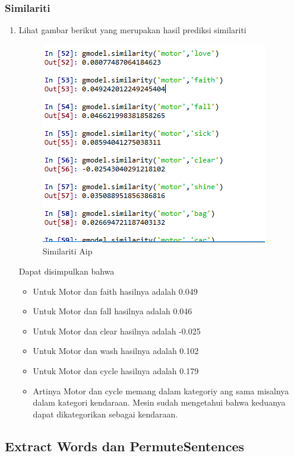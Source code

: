 \subsubsection{Similariti}
\begin{enumerate}
\item Lihat gambar berikut yang merupakan hasil prediksi similariti
\begin{figure}[ht]
\centering
\includegraphics[scale=0.3]{figures/AIP/e17.PNG}
\caption{Similariti Aip}
\label{Praktek}
\end{figure}

Dapat disimpulkan bahwa
\begin{itemize}
\item Untuk Motor dan faith hasilnya adalah 0.049
\item Untuk Motor dan fall hasilnya adalah 0.046
\item Untuk Motor dan clear hasilnya adalah -0.025
\item Untuk Motor dan wash hasilnya adalah 0.102
\item Untuk Motor dan cycle hasilnya adalah 0.179
\item Artinya Motor dan cycle memang dalam kategoriy ang sama misalnya dalam kategori kendaraan. Mesin sudah mengetahui bahwa keduanya dapat dikategorikan sebagai kendaraan.
\end{itemize}
\end{enumerate}

\subsection{Extract Words dan PermuteSentences}
